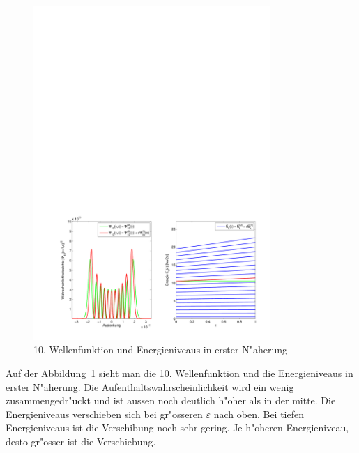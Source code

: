 \begin{refsection}
\begin{figure}	%
\centering
\includegraphics[width=0.8\textwidth]{anharmonisch/images/x4/Stoerung1Wellenfunktion.pdf}
\caption{10. Wellenfunktion und Energieniveaus in erster N"aherung
\label{skript:x4_Stoerung1Wellenfunktion}}
\end{figure}

Auf der Abbildung~\ref{skript:x4_Stoerung1Wellenfunktion} sieht man die 10. Wellenfunktion und die Energieniveaus in erster N"aherung. Die Aufenthaltswahrscheinlichkeit wird ein wenig zusammengedr"uckt und ist aussen noch deutlich h"oher als in der mitte. Die Energieniveaus verschieben sich bei gr"osseren $\varepsilon$ nach oben. Bei tiefen Energieniveaus ist die Verschibung noch sehr gering. Je h"oheren Energieniveau, desto gr"osser ist die Verschiebung.


\end{refsection}
